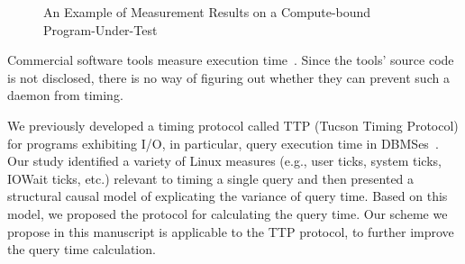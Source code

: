 \documentclass[letter]{ieice}
\begin{document}
\begin{figure}[t]
	\centering
	\caption{An Example of Measurement Results on a \linebreak \hbox{Compute-bound} 
	Program-Under-Test~\label{fig:meas_comp}}
	\vspace{-.18in}
\end{figure} 

Commercial software tools measure execution time~\cite{VTune,TimeSys,WindView}. 
Since the tools' source code is not disclosed, there is no way of figuring out 
whether they can prevent such a daemon from timing. 

We previously developed a timing protocol called TTP (Tucson Timing Protocol)
for programs exhibiting I/O, in particular, query execution time in \hbox{DBMSes}~\cite{Currim}.
Our study identified a variety of Linux measures 
(e.g., user ticks, system ticks, IOWait ticks, etc.) 
relevant to timing a single query and then 
presented a structural causal model 
of explicating the variance of query time. 
Based on this model, we proposed the protocol for calculating the query time. 
Our scheme we propose in this manuscript 
is applicable to the TTP protocol, to further improve the query time calculation.
\end{document}
